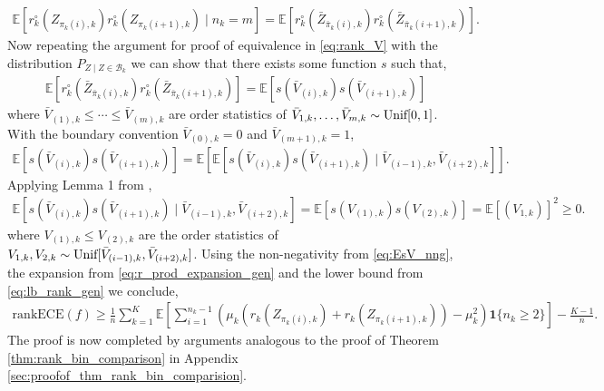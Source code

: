 \documentclass[11pt]{article}
\numberwithin{equation}{section}
\theoremstyle{definition}
\newcommand{\E}{\mathbb{E}}
\newcommand{\cB}{\mathcal{B}}
\newcommand{\one}{\bm{1}}
\newcommand{\rankECE}{\mathrm{rankECE}}
\begin{document}
\begin{align*}
    \E\left[r_k^\circ\left(Z_{\pi_k(i),k}\right)r_k^\circ\left(Z_{\pi_{k}(i+1),k}\right)\mid n_k = m\right] = \E\left[r_k^\circ\left(\bar Z_{\bar \pi_k(i),k}\right)r_k^\circ\left(\bar Z_{\bar \pi_{k}(i+1),k}\right)\right].
\end{align*}
Now repeating the argument for proof of equivalence in \eqref{eq:rank_V} with the distribution $P_{Z\mid Z\in \cB_k}$ we can show that there exists some function $s$ such that,
\begin{align*}
    \E\left[r_k^\circ\left(\bar Z_{\bar \pi_k(i),k}\right)r_k^\circ\left(\bar Z_{\bar \pi_{k}(i+1),k}\right)\right] = \E\left[s\left(\bar V_{(i),k}\right)s\left(\bar V_{(i+1),k}\right)\right]
\end{align*}
where $\bar V_{(1),k}\leq \cdots\leq \bar V_{(m),k}$ are order statistics of $\bar V_{1,k},\ldots, \bar V_{m,k}\sim\textnormal{Unif}[0,1]$. With the boundary convention $\bar V_{(0), k} = 0$ and $\bar V_{(m+1), k} = 1$,
\begin{align*}
    \E\left[s\left(\bar V_{(i),k}\right)s\left(\bar V_{(i+1),k}\right)\right] = \E\left[\E\left[s\left(\bar V_{(i),k}\right)s\left(\bar V_{(i+1),k}\right)\mid \bar V_{(i-1),k}, \bar V_{(i+2), k}\right]\right].
\end{align*}
Applying Lemma 1 from \cite{gupta2021distribution},
\begin{align}\label{eq:EsV_nng}
    \E\left[s\left(\bar V_{(i),k}\right)s\left(\bar V_{(i+1),k}\right)\mid \bar V_{(i-1),k}, \bar V_{(i+2), k}\right] = \E\left[s\left(V_{(1),k}\right)s\left(V_{(2),k}\right)\right] = \E\left[\left(V_{1,k}\right)\right]^2\geq 0.
\end{align}
where $V_{(1),k}\leq V_{(2),k}$ are the order statistics of $V_{1,k}, V_{2,k}\sim\textnormal{Unif}[\bar V_{(i-1),k}, \bar V_{(i+2), k}]$. Using the non-negativity from \eqref{eq:EsV_nng}, the expansion from \eqref{eq:r_prod_expansion_gen} and the lower bound from \eqref{eq:lb_rank_gen} we conclude,
\begin{align*}
    \rankECE(f)\geq \frac{1}{n}\sum_{k=1}^{K}\E\left[\sum_{i=1}^{n_k-1}\left(\mu_k\left(r_k\left(Z_{\pi_k(i),k}\right)+r_k\left(Z_{\pi_{k}(i+1),k}\right)\right) - \mu_k^2\right)\one\{n_k\geq 2\}\right]-\frac{K-1}{n}.
\end{align*}
The proof is now completed by arguments analogous to the proof of Theorem \ref{thm:rank_bin_comparison} in Appendix \ref{sec:proofof_thm_rank_bin_comparision}.
\end{document}
